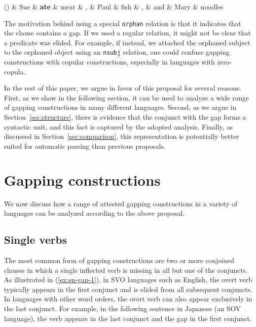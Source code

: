 \documentclass[11pt]{article}
\newenvironment{myquote}%
  {\list{}{\leftmargin=0.0in\rightmargin=0.0in}\item[]}%
  {\endlist}
\newcounter{excounter}
\begin{document}
\begin{myquote}
  \label{ex:en-gap-1}
  \footnotesize
  \begin{dependency}
    \begin{deptext}[column sep=0.1cm]
      (\theexcounter) \& Sue \& \textbf{ate} \& meat \& , \& Paul \& fish \& , \& and \& Mary \& noodles \\
    \end{deptext}
  \end{dependency}
\end{myquote}

The motivation behind using a special \texttt{orphan} relation 
is that it indicates that the clause contains a gap.
If we used a regular relation, it might not be clear that a predicate was elided. 
For example, if instead, we attached the orphaned subject to the orphaned object using an \texttt{nsubj} relation, 
one could confuse gapping constructions with copular constructions, especially in languages with zero-copula.

In the rest of this paper, we argue in favor of this proposal for several reasons. First, as we show in the following section, it can
be used to analyze a wide range of gapping constructions in many different languages. Second, 
as we argue in Section~\ref{sec:structure}, there is evidence that the conjunct with the gap forms a syntactic unit,
and this fact is captured by the adopted analysis. Finally, as  discussed in Section~\ref{sec:comparison}, this representation is
potentially better suited for automatic parsing than previous proposals.

\section{Gapping constructions}

We now discuss how a range of attested gapping constructions 
in a variety of languages can be analyzed according to the above proposal.


\subsection{Single verbs}

The most common form of gapping constructions are two or more conjoined clauses
in which a single inflected verb is missing in all but one of the conjuncts. As illustrated
in (\ref{ex:en-gap-1}), in SVO languages such as English, the overt verb typically 
appears in the first conjunct and is elided from all subsequent conjuncts. In languages 
with other word orders, the overt verb can also appear exclusively in the last conjunct.
For example, in the following sentence in Japanese (an SOV language), the verb appears 
in the last conjunct and the gap in the first conjunct.
\end{document}
